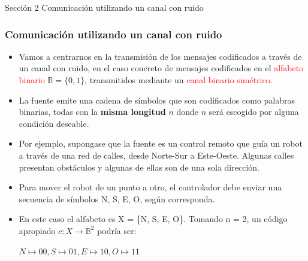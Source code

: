 \documentclass{beamer}
\theoremstyle{plain}
\theoremstyle{example}
\theoremstyle{example}
\begin{document}
\begin{frame}   \footnotesize
{
\begin{block}{Sección 2}
Comunicación utilizando un canal con ruido
\end{block}
}
\end{frame} 
\begin{frame}  \frametitle{Comunicación utilizando un canal con ruido}\small  
\begin{itemize} 

 \item Vamos a centrarnos en la transmisión de los mensajes codificados a través de un canal con ruido, en el caso concreto de mensajes codificados en el \textcolor{red}{alfabeto binario} $\mathbb{B} =\{0,1\}$, transmitidos mediante un \textcolor{red}{canal binario simétrico}.

\item  La fuente emite una cadena de símbolos que son codificados como palabras binarias, todas con la \textbf{misma longitud} $n$ donde $n$ será escogido por alguna condición deseable. 


\item Por ejemplo, supongase que la fuente es un control remoto que guía un robot a través de una red de calles, desde Norte-Sur a Este-Oeste. Algunas calles presentan obstáculos y algunas de ellas son de una sola dirección. 

\item Para mover el robot de un punto a otro, el controlador debe enviar una secuencia de símbolos N, S, E, O, según corresponda.

\item En este caso el alfabeto es X = \{N, S, E, O\}. Tomando n = 2, un código apropiado $c: X \rightarrow\mathbb{B}^{2}$ podría ser:

\begin{center}
$N \mapsto 00, S \mapsto 01, E \mapsto 10, O \mapsto 11$
\end{center}


\end{itemize} \end{frame} 
\end{document}
